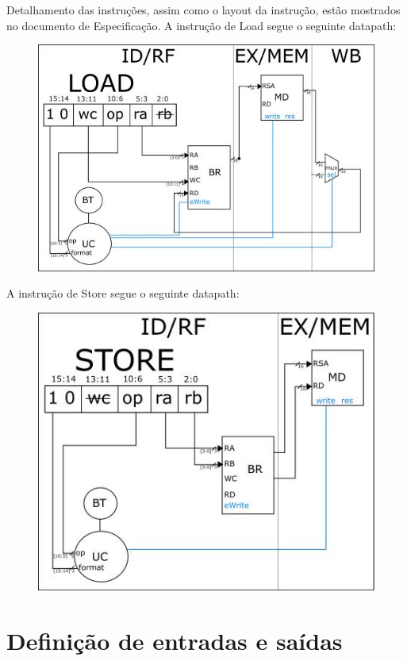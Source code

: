 \documentclass{article}
\begin{document}
  Detalhamento das instruções, assim como o layout da instrução, estão mostrados no documento de Especificação.
  A instrução de Load segue o seguinte datapath:
  \begin{figure}[H]
	\centering
	\includegraphics[scale=0.58]{./pictures/load.png}
\end{figure}  
\newpage
A instrução de Store segue o seguinte datapath:
\begin{figure}[H]
	\centering
	\includegraphics[scale=0.58]{./pictures/store.png}
\end{figure}  
  
  
  \newpage
  
  
  
\section{Definição de entradas e saídas}
\end{document}
